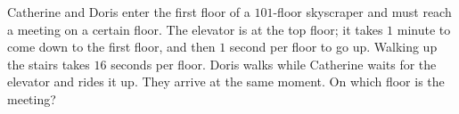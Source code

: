 Catherine and Doris enter the first floor of a $101$-floor skyscraper and must reach a meeting on a certain floor. The elevator is at the top floor; it takes $1$ minute to come down to the first floor, and then $1$ second per floor to go up. Walking up the stairs takes $16$ seconds per floor. Doris walks while Catherine waits for the elevator and rides it up. They arrive at the same moment. On which floor is the meeting?
